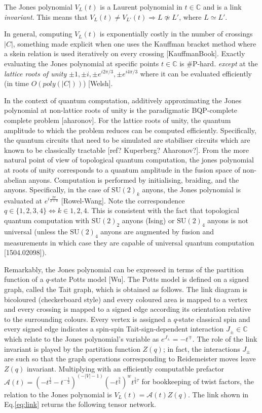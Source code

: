 \documentclass[submission,copyright,creativecommons]{eptcs}
\begin{document}
The Jones polynomial $V_L(t)$
is a Laurent polynomial in $t\in\mathbb{C}$
and is a link \emph{invariant}.
This means that
$V_L(t)\neq V_{L'}(t)\Rightarrow L\not\simeq L'$,
where $L\simeq L'$.

In general, computing $V_L(t)$
is exponentially costly in the number of crossings $|C|$,
something made explicit when one uses the Kauffman bracket method where a skein relation is used iteratively on every crossing [KauffmanBook].
Exactly evaluating the Jones polynomial at specific points $t\in\mathbb{C}$ is \#P-hard.
\emph{except} at the \emph{lattice roots of unity} $\pm 1, \pm i, \pm e^{i 2\pi/3}, \pm e^{i 4\pi/3}$ where it can be evaluated efficiently (in time $O(poly(|C|))$) [Welsh].


In the context of quantum computation,
additively approximating the Jones polynomial at non-lattice roots of unity is the paradigmatic BQP-complete complete problem [aharonov].
For the lattice roots of unity, the quantum amplitude to which the problem reduces can be computed efficiently.
Specifically, the quantum circuits that need to be simulated are stabiliser circuits which are known to be classically tractable [ref? Kuperberg? Aharonov?].
From the more natural point of view of topological quantum computation,
the jones polynomial at roots of unity corresponds to a quantum amplitude in the fusion space of non-abelian anyons.
Computation is performed by initialising, braiding, and the anyons.
Specifically, in the case of $\text{SU}(2)_k$ anyons, the Jones polynomial is evaluated at $e^{i\frac{2\pi}{2+k}}$ [Rowel-Wang]. Note the correspondence $q\in\{1,2,3,4\}\Leftrightarrow k\in{1,2,4}$.
This is consistent with the fact that topological quantum computation with $\text{SU}(2)_2$ anyons (Ising) or $\text{SU}(2)_4$ anyons is not universal (unless the $\text{SU}(2)_4$ anyons are augmented by fusion and measurements in which case they are capable of universal quantum computation [1504.02098]).



Remarkably, the Jones polynomial can be expressed in terms of the partition function of a $q$-state Potts model [Wu].
The Potts model is defined on a signed graph, called the Tait graph, which is obtained as follows.
The link diagram is bicoloured (checkerboard style)
and every coloured area is mapped to a vertex and every crossing is mapped to a signed edge according
its orientation relative to the surrounding colours.
Every vertex is assigned a $q$-state classical spin
and every signed edge indicates a spin-spin Tait-sign-dependent interaction $J_\pm\in\mathbb{C}$ which relate to the Jones polynomial's variable as $e^{J_\pm}=-t^\mp$.
The role of the link invariant is played by the partition function $Z(q)$;
in fact, the interactions $J_\pm$ are such so that the graph operations corresponding to Reidemeister moves leave $Z(q)$ invariant.
Multiplying with an efficiently computatble prefactor $\mathcal{A}(t) = (-t^\frac{1}{2}-t^{-\frac{1}{2}})^{(-|V|-1)} (-t^\frac{3}{4})^w t^{\frac{1}{4}\tau}$ for bookkeeping of twist factors, the relation to the Jones polynomial is
$V_L(t) = \mathcal{A}(t) Z(q)$.
The link shown in Eq.\ref{eq:link} returns the following tensor network.
\end{document}
